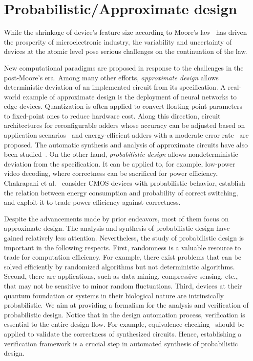 \section{Probabilistic/Approximate design}
\label{sect:related-work-prob-approx}

While the shrinkage of device's feature size according to Moore's law~\cite{Moore1965}
has driven the prosperity of microelectronic industry,
the variability and uncertainty of devices at the atomic level
pose serious challenges on the continuation of the law.

New computational paradigms are proposed in response to the challenges in the post-Moore's era.
Among many other efforts,
\textit{approximate design} allows deterministic deviation of an implemented circuit from its specification.
A real-world example of approximate design is the deployment of neural networks to edge devices.
Quantization is often applied to convert floating-point parameters to fixed-point ones to reduce hardware cost.
Along this direction, circuit architectures for reconfigurable adders whose accuracy can be adjusted based on application scenarios~\cite{Kahng2012,Ye2013} and energy-efficient adders with a moderate error rate~\cite{Kim2013} are proposed.
The automatic synthesis and analysis of approximate circuits have also been studied~\cite{Venkatesan2011ApproxDesign,Venkataramani2012,Miao2013,Miao2014,Li2014,Mrazek2016,Rehman2016}.
On the other hand, \textit{probabilistic design} allows nondeterministic deviation from the specification.
It can be applied to, for example, low-power video decoding, where correctness can be sacrificed for power efficiency.
Chakrapani et al.~\cite{Chakrapani2006ProbDesign} consider CMOS devices with probabilistic behavior,
establish the relation between energy consumption and probability of correct switching,
and exploit it to trade power efficiency against correctness.

Despite the advancements made by prior endeavors, most of them focus on approximate design.
The analysis and synthesis of probabilistic design have gained relatively less attention.
Nevertheless, the study of probabilistic design is important in the following respects.
First, randomness is a valuable resource to trade for computation efficiency.
For example, there exist problems that can be solved efficiently by randomized algorithms
but not deterministic algorithms.
Second, there are applications, such as data mining, compressive sensing, etc.,
that may not be sensitive to minor random fluctuations.
Third, devices at their quantum foundation or systems in their biological nature are intrinsically probabilistic.
We aim at providing a formalism for the analysis and verification of probabilistic design.
Notice that in the design automation process,
verification is essential to the entire design flow.
For example, equivalence checking~\cite{Kuehlmann1997,Mishchenko2006}
should be applied to validate the correctness of synthesized circuits.
Hence, establishing a verification framework is a crucial step in automated synthesis of probabilistic design.

